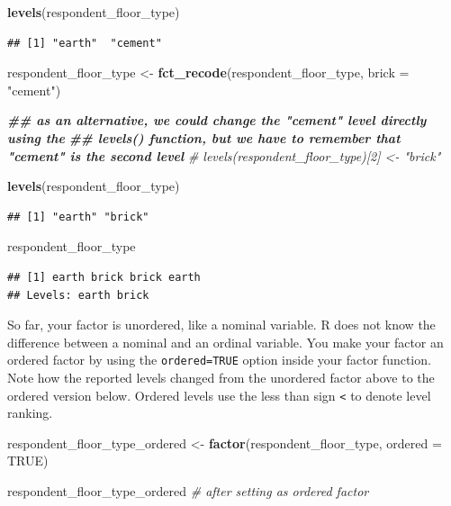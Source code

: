 \documentclass[
]{article}
\newenvironment{Shaded}{\begin{snugshade}}{\end{snugshade}}
\newcommand{\AttributeTok}[1]{\textcolor[rgb]{0.13,0.29,0.53}{#1}}
\newcommand{\CommentTok}[1]{\textcolor[rgb]{0.56,0.35,0.01}{\textit{#1}}}
\newcommand{\ConstantTok}[1]{\textcolor[rgb]{0.56,0.35,0.01}{#1}}
\newcommand{\DocumentationTok}[1]{\textcolor[rgb]{0.56,0.35,0.01}{\textbf{\textit{#1}}}}
\newcommand{\FunctionTok}[1]{\textcolor[rgb]{0.13,0.29,0.53}{\textbf{#1}}}
\newcommand{\NormalTok}[1]{#1}
\newcommand{\OtherTok}[1]{\textcolor[rgb]{0.56,0.35,0.01}{#1}}
\newcommand{\StringTok}[1]{\textcolor[rgb]{0.31,0.60,0.02}{#1}}
\begin{document}
\begin{Shaded}
\begin{Highlighting}[]
\FunctionTok{levels}\NormalTok{(respondent\_floor\_type)}
\end{Highlighting}
\end{Shaded}

\begin{verbatim}
## [1] "earth"  "cement"
\end{verbatim}

\begin{Shaded}
\begin{Highlighting}[]
\NormalTok{respondent\_floor\_type }\OtherTok{\textless{}{-}} \FunctionTok{fct\_recode}\NormalTok{(respondent\_floor\_type, }\AttributeTok{brick =} \StringTok{"cement"}\NormalTok{)}

\DocumentationTok{\#\# as an alternative, we could change the "cement" level directly using the}
\DocumentationTok{\#\# levels() function, but we have to remember that "cement" is the second level}
\CommentTok{\# levels(respondent\_floor\_type)[2] \textless{}{-} "brick"}

\FunctionTok{levels}\NormalTok{(respondent\_floor\_type)}
\end{Highlighting}
\end{Shaded}

\begin{verbatim}
## [1] "earth" "brick"
\end{verbatim}

\begin{Shaded}
\begin{Highlighting}[]
\NormalTok{respondent\_floor\_type}
\end{Highlighting}
\end{Shaded}

\begin{verbatim}
## [1] earth brick brick earth
## Levels: earth brick
\end{verbatim}

So far, your factor is unordered, like a nominal variable. R does not
know the difference between a nominal and an ordinal variable. You make
your factor an ordered factor by using the \texttt{ordered=TRUE} option
inside your factor function. Note how the reported levels changed from
the unordered factor above to the ordered version below. Ordered levels
use the less than sign \texttt{\textless{}} to denote level ranking.

\begin{Shaded}
\begin{Highlighting}[]
\NormalTok{respondent\_floor\_type\_ordered }\OtherTok{\textless{}{-}} \FunctionTok{factor}\NormalTok{(respondent\_floor\_type, }
                                        \AttributeTok{ordered =} \ConstantTok{TRUE}\NormalTok{)}

\NormalTok{respondent\_floor\_type\_ordered }\CommentTok{\# after setting as ordered factor}
\end{Highlighting}
\end{Shaded}
\end{document}
